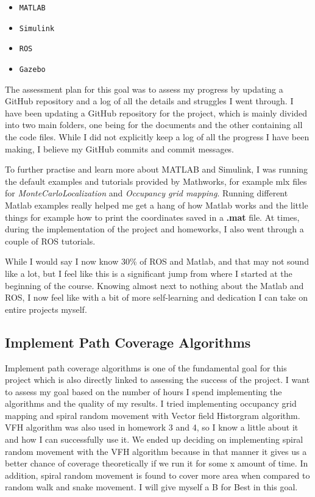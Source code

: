 \documentclass[12pt]{article}
\begin{document}
\begin{itemize}
    \item \texttt{MATLAB}
    \item \texttt{Simulink}
    \item \texttt{ROS}
    \item \texttt{Gazebo}
\end{itemize}

The assessment plan for this goal was to assess my progress by updating a
GitHub repository and a log of all the details and struggles I went through. I
have been updating a GitHub repository for the project, which is mainly divided
into two main folders, one being for the documents and the other containing all
the code files. While I did not explicitly keep a log of all the progress I
have been making, I believe my GitHub commits and commit messages.

To further practise and learn more about MATLAB and Simulink, I was running the
default examples and tutorials provided by Mathworks, for example mlx files for
\textit{MonteCarloLocalization} and \textit{Occupancy grid mapping}. Running
different Matlab examples really helped me get a hang of how Matlab works and
the little things for example how to print the coordinates saved in a
\textbf{.mat} file. At times, during the implementation of the project and
homeworks, I also went through a couple of ROS tutorials.

While I would say I now know 30\% of ROS and Matlab, and that may not sound
like a lot, but I feel like this is a significant jump from where I started at
the beginning of the course. Knowing almost next to nothing about the Matlab
and ROS, I now feel like with a bit of more self-learning and dedication I can
take on entire projects myself.

\subsection*{Implement Path Coverage Algorithms}
Implement path coverage algorithms is one of the fundamental goal for this
project which is also directly linked to assessing the success of the project.
I want to assess my goal based on the number of hours I spend implementing the
algorithms and the quality of my results. I tried implementing occupancy grid
mapping and spiral random movement with Vector field Historgram algorithm. VFH
algorithm was also used in homework 3 and 4, so I know a little about it and
how I can successfully use it. We ended up deciding on implementing spiral random movement with the VFH algorithm because in that manner it gives us a better chance of coverage theoretically if we run it for some x amount of time. 
In addition, spiral random movement is found to cover more area when compared to random walk and snake movement. I will give myself a B for Best in this goal. 
\end{document}
